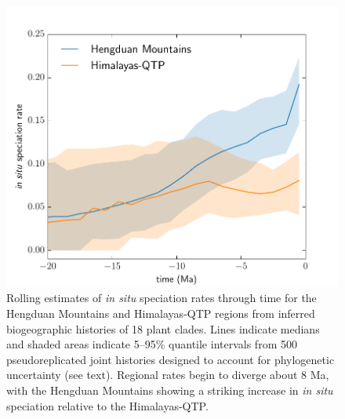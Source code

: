 \documentclass[12pt]{article}
\begin{document}
\begin{figure}
\begin{center}
\includegraphics[width=.99\textwidth]{figures/figure_speciation_rates/figure_speciation_rates.pdf}
\end{center}
\caption{Rolling estimates of \textit{in situ} speciation rates through time for the Hengduan Mountains and Himalayas-QTP regions from inferred biogeographic histories of 18 plant clades. Lines indicate medians and shaded areas indicate 5--95\% quantile intervals from 500 pseudoreplicated joint histories designed to account for phylogenetic uncertainty (see text). Regional rates begin to diverge about 8 Ma, with the Hengduan Mountains showing a striking increase in \textit{in situ} speciation relative to the Himalayas-QTP.}
\label{fig:speciation}
\end{figure}
\end{document}
